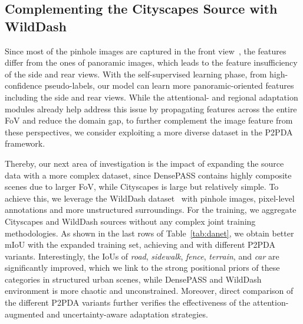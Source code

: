 \documentclass[journal]{IEEEtran}
\begin{document}
\subsection{Complementing the Cityscapes Source with WildDash}
\label{sec:wilddash}
Since most of the pinhole images are captured in the front view~\cite{cityscapes}, the features differ from the ones of  panoramic images, which leads to the feature insufficiency of the side and rear views.
With the self-supervised learning phase, from high-confidence pseudo-labels, our model can learn more panoramic-oriented features including the side and rear views.
While the attentional- and regional adaptation modules already help address this issue by propagating features across the entire FoV and reduce the domain gap, to further complement the image feature from these perspectives, we consider exploiting a more diverse dataset in the P2PDA framework. 

Thereby, our next area of investigation is the impact of expanding the source data with a more complex dataset, since DensePASS contains highly composite scenes due to larger FoV, while Cityscapes is large but relatively simple.
To achieve this, we leverage the WildDash dataset~\cite{wilddash} with  pinhole images, pixel-level annotations and more unstructured surroundings.
For the training, we aggregate Cityscapes and WildDash sources without any complex joint training methodologies.
As shown in the last rows of Table~\ref{tab:danet}, we obtain better mIoU with the expanded training set, achieving  and  with different P2PDA variants.
Interestingly, the IoUs of \emph{road}, \emph{sidewalk}, \emph{fence}, \emph{terrain}, and \emph{car}
are significantly improved, which we link to the strong positional priors of these categories in structured urban scenes, while DensePASS and WildDash environment is more chaotic and unconstrained.
Moreover, direct comparison of the different P2PDA variants further verifies the effectiveness of the attention-augmented and uncertainty-aware adaptation strategies.

\end{document}
